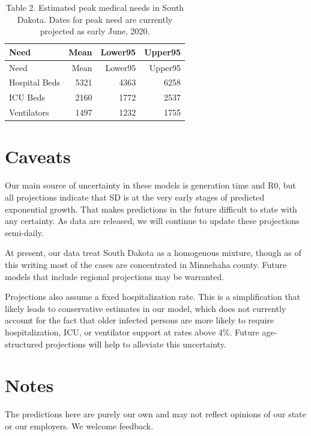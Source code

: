 \documentclass[
]{article}
\begin{document}
\begin{longtable}[]{@{}lrrr@{}}
\caption{Table 2. Estimated peak medical needs in South Dakota. Dates
for peak need are currently projected as early June,
2020.}\tabularnewline
\toprule
Need & Mean & Lower95 & Upper95\tabularnewline
\midrule
\endfirsthead
\toprule
Need & Mean & Lower95 & Upper95\tabularnewline
\midrule
\endhead
Hospital Beds & 5321 & 4363 & 6258\tabularnewline
ICU Beds & 2160 & 1772 & 2537\tabularnewline
Ventilators & 1497 & 1232 & 1755\tabularnewline
\bottomrule
\end{longtable}

\hypertarget{caveats}{%
\section{Caveats}\label{caveats}}

Our main source of uncertainty in these models is generation time and
R0, but all projections indicate that SD is at the very early stages of
predicted exponential growth. That makes predictions in the future
difficult to state with any certainty. As data are released, we will
continue to update these projections semi-daily.

At present, our data treat South Dakota as a homogenous mixture, though
as of this writing most of the cases are concentrated in Minnehaha
county. Future models that include regional projections may be
warranted.

Projections also assume a fixed hospitalization rate. This is a
simplification that likely leads to conservative estimates in our model,
which does not currently account for the fact that older infected
persons are more likely to require hospitalization, ICU, or ventilator
support at rates above 4\%. Future age-structured projections will help
to alleviate this uncertainty.

\hypertarget{notes}{%
\section{Notes}\label{notes}}

The predictions here are purely our own and may not reflect opinions of
our state or our employers. We welcome feedback.
\end{document}
